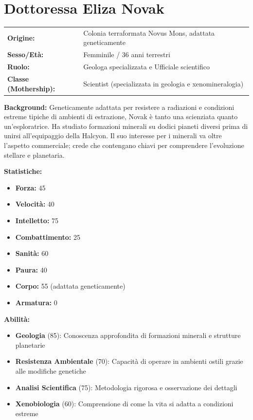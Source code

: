 \documentclass[11pt,a4paper]{article}
\begin{document}
\section{Dottoressa Eliza Novak}

\begin{tcolorbox}[colback=mininglightorange!20, colframe=miningorange]
\begin{tabularx}{\textwidth}{lX}
\textbf{Origine:} & Colonia terraformata Novus Mons, adattata geneticamente \\
\textbf{Sesso/Età:} & Femminile / 36 anni terrestri \\
\textbf{Ruolo:} & Geologa specializzata e Ufficiale scientifico \\
\textbf{Classe (Mothership):} & Scientist (specializzata in geologia e xenomineralogia) \\
\end{tabularx}

\textbf{Background:} Geneticamente adattata per resistere a radiazioni e condizioni estreme tipiche di ambienti di estrazione, Novak è tanto una scienziata quanto un'esploratrice. Ha studiato formazioni minerali su dodici pianeti diversi prima di unirsi all'equipaggio della Halcyon. Il suo interesse per i minerali va oltre l'aspetto commerciale; crede che contengano chiavi per comprendere l'evoluzione stellare e planetaria.

\textbf{Statistiche:}
\begin{itemize}[leftmargin=*]
\item \textbf{Forza:} 45
\item \textbf{Velocità:} 40
\item \textbf{Intelletto:} 75
\item \textbf{Combattimento:} 25
\item \textbf{Sanità:} 60
\item \textbf{Paura:} 40
\item \textbf{Corpo:} 55 (adattata geneticamente)
\item \textbf{Armatura:} 0
\end{itemize}

\textbf{Abilità:}
\begin{itemize}[leftmargin=*]
\item \textbf{Geologia} (85): Conoscenza approfondita di formazioni minerali e strutture planetarie
\item \textbf{Resistenza Ambientale} (70): Capacità di operare in ambienti ostili grazie alle modifiche genetiche
\item \textbf{Analisi Scientifica} (75): Metodologia rigorosa e osservazione dei dettagli
\item \textbf{Xenobiologia} (60): Comprensione di come la vita si adatta a condizioni estreme
\end{itemize}


\end{tcolorbox}
\end{document}
